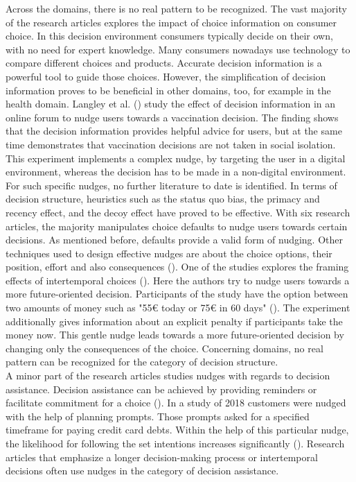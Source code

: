 Across the domains, there is no real pattern to be recognized. The vast majority of the research articles explores the impact of choice information on consumer choice. In this decision environment consumers typically decide on their own, with no need for expert knowledge. Many consumers nowadays use technology to compare different choices and products. Accurate decision information is a powerful tool to guide those choices. 
However, the simplification of decision information proves to be beneficial in other domains, too, for example in the health domain. Langley et al. (\citeyear{langley_should_2015}) study the effect of decision information in an online forum to nudge users towards a vaccination decision. The finding shows that the decision information provides helpful advice for users, but at the same time demonstrates that vaccination decisions are not taken in social isolation. This experiment implements a complex nudge, by targeting the user in a digital environment, whereas the decision has to be made in a non-digital environment. For such specific nudges, no further literature to date is identified.
In terms of decision structure, heuristics such as the status quo bias, the primacy and recency effect, and the decoy effect have proved to be effective. With six research articles, the majority manipulates choice defaults to nudge users towards certain decisions. As mentioned before, defaults provide a valid form of nudging. Other techniques used to design effective nudges are about the choice options, their position, effort and also consequences (\cite{munscher_review_2016}). One of the studies explores the framing effects of intertemporal choices (\cite{faralla_framing_2017}). Here the authors try to nudge users towards a more future-oriented decision. Participants of the study have the option between two amounts of money such as "55€ today or 75€ in 60 days" (\cite[p.13]{faralla_framing_2017}). The experiment additionally gives information about an explicit penalty if participants take the money now. This gentle nudge leads towards a more future-oriented decision by changing only the consequences of the choice. Concerning domains, no real pattern can be recognized for the category of decision structure.
\\

A minor part of the research articles studies nudges with regards to decision assistance. Decision assistance can be achieved by providing reminders or facilitate commitment for a choice (\cite{munscher_review_2016}). In a study of 2018 customers were nudged with the help of planning prompts. Those prompts asked for a specified timeframe for paying credit card debts. Within the help of this particular nudge, the likelihood for following the set intentions increases significantly (\cite{mazar_if_2018}).
Research articles that emphasize a longer decision-making process or intertemporal decisions often use nudges in the category of decision assistance.
\\

